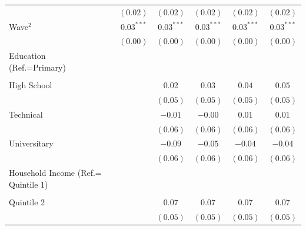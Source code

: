 \documentclass[
  12pt,
  a4paper,
]{article}
\begin{document}
\begin{table}[!ht]
\begin{center}
{\begin{tabular}{l c c c c c c}
                                    &               & $(0.02)$      & $(0.02)$      & $(0.02)$      & $(0.02)$      & $(0.02)$      \\
Wave$^2$                            &               & $0.03^{***}$  & $0.03^{***}$  & $0.03^{***}$  & $0.03^{***}$  & $0.03^{***}$  \\
                                    &               & $(0.00)$      & $(0.00)$      & $(0.00)$      & $(0.00)$      & $(0.00)$      \\
Education (Ref.=Primary)            &               &               &               &               &               &               \\
                                    &               &               &               &               &               &               \\
\quad High School                   &               &               & $0.02$        & $0.03$        & $0.04$        & $0.05$        \\
                                    &               &               & $(0.05)$      & $(0.05)$      & $(0.05)$      & $(0.05)$      \\
\quad Technical                     &               &               & $-0.01$       & $-0.00$       & $0.01$        & $0.01$        \\
                                    &               &               & $(0.06)$      & $(0.06)$      & $(0.06)$      & $(0.06)$      \\
\quad Universitary                  &               &               & $-0.09$       & $-0.05$       & $-0.04$       & $-0.04$       \\
                                    &               &               & $(0.06)$      & $(0.06)$      & $(0.06)$      & $(0.06)$      \\
Household Income (Ref.= Quintile 1) &               &               &               &               &               &               \\
                                    &               &               &               &               &               &               \\
\quad Quintile 2                    &               &               & $0.07$        & $0.07$        & $0.07$        & $0.07$        \\
                                    &               &               & $(0.05)$      & $(0.05)$      & $(0.05)$      & $(0.05)$      \\

\end{tabular}}
\end{center}
\end{table}
\end{document}

